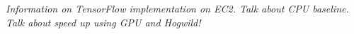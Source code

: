 \textit{Information on TensorFlow implementation on EC2. Talk about CPU baseline. Talk about speed up using GPU and Hogwild!}